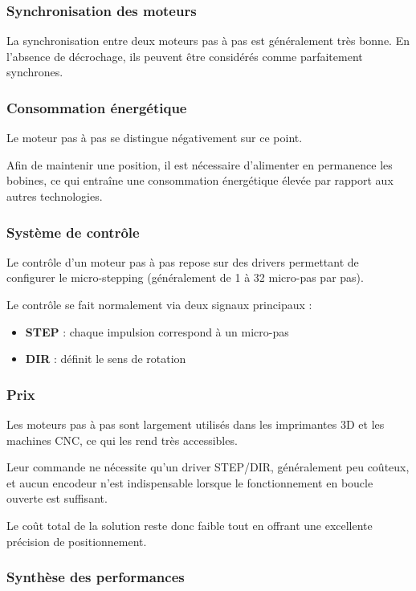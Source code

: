 \subsubsection{Synchronisation des moteurs}

La synchronisation entre deux moteurs pas à pas est généralement très bonne. En l'absence de décrochage, ils peuvent être considérés comme parfaitement synchrones.

\subsubsection{Consommation énergétique}

Le moteur pas à pas se distingue négativement sur ce point.

Afin de maintenir une position, il est nécessaire d'alimenter en permanence les bobines, ce qui entraîne une consommation énergétique élevée par rapport aux autres technologies.

\subsubsection{Système de contrôle}

Le contrôle d'un moteur pas à pas repose sur des drivers permettant de configurer le micro-stepping (généralement de 1 à 32 micro-pas par pas).

Le contrôle se fait normalement via deux signaux principaux :

\begin{itemize}
    \item \textbf{STEP} : chaque impulsion correspond à un micro-pas
    \item \textbf{DIR} : définit le sens de rotation
\end{itemize}
\subsubsection{Prix}

Les moteurs pas à pas sont largement utilisés dans les imprimantes 3D et les machines CNC, ce qui les rend très accessibles.

Leur commande ne nécessite qu'un driver STEP/DIR, généralement peu coûteux, et aucun encodeur n'est indispensable lorsque le fonctionnement en boucle ouverte est suffisant.

Le coût total de la solution reste donc faible tout en offrant une excellente précision de positionnement.

\subsubsection{Synthèse des performances}


